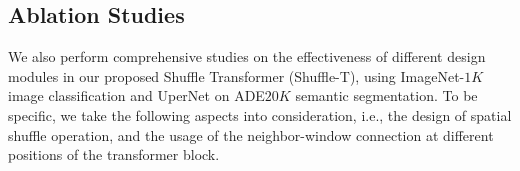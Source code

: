 \documentclass{article}
\begin{document}
\begin{table}
\caption{ Ablation study on the effect of spatial shuffle and the neighbor-window connection on two benchmarks, FLOPs is measured on $224\times224$ resolution. }
\label{tab:ab_sps}
\begin{center}
\end{center}
\vspace{-0mm}
\end{table}

\begin{table}
\caption{ Ablation study on different ways to spatial shuffle on two benchmarks. }
\label{tab:ab_long_range_shuffle}
\begin{center}
\end{center}
\vspace{-3mm}
\end{table}

\subsection{Ablation Studies}
We also perform comprehensive studies on the effectiveness of different design modules in our proposed Shuffle Transformer (Shuffle-T), using ImageNet-$1K$ image classification and UperNet on ADE$20K$ semantic segmentation. To be specific, we take the following aspects into consideration, i.e., the design of spatial shuffle operation, and the usage of the neighbor-window connection at different positions of the transformer block.
\end{document}
